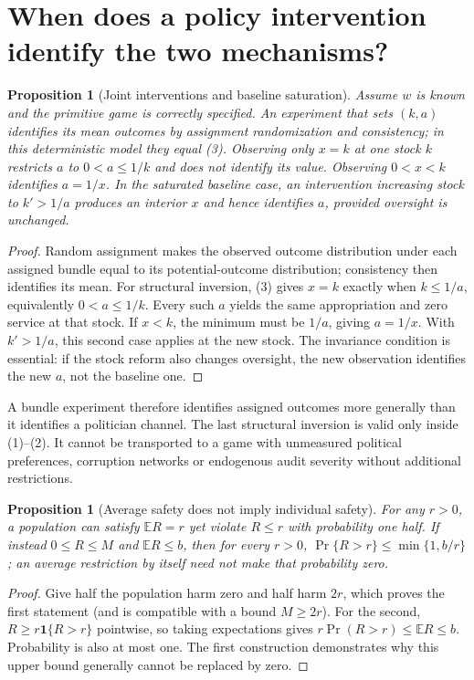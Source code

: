 \documentclass[11pt]{article}
\newtheorem{proposition}[theorem]{Proposition}
\newcommand{\E}{\mathbb E}
\newcommand{\Ind}{\mathbf 1}
\begin{document}
\section{When does a policy intervention identify the two mechanisms?}
\begin{proposition}[Joint interventions and baseline saturation]
Assume $w$ is known and the primitive game is correctly specified.
An experiment that sets $(k,a)$ identifies its mean outcomes by assignment
randomization and consistency; in this deterministic model they equal
(3). Observing only $x=k$ at one stock $k$ restricts $a$ to
$0<a\leq1/k$ and does not identify its value. Observing $0<x<k$ identifies
$a=1/x$. In the saturated baseline case, an intervention increasing stock
to $k'>1/a$ produces an interior $x$ and hence identifies $a$, provided
oversight is unchanged.
\end{proposition}
\begin{proof}
Random assignment makes the observed outcome distribution under each
assigned bundle equal to its potential-outcome distribution; consistency
then identifies its mean. For structural inversion, (3) gives $x=k$
exactly when $k\leq1/a$, equivalently $0<a\leq1/k$. Every such $a$
yields the same appropriation and zero service at that stock. If $x<k$,
the minimum must be $1/a$, giving $a=1/x$. With $k'>1/a$, this second
case applies at the new stock. The invariance condition is essential:
if the stock reform also changes oversight, the new observation identifies
the new $a$, not the baseline one.
\end{proof}
A bundle experiment therefore identifies assigned outcomes more generally
than it identifies a politician channel. The last structural inversion is
valid only inside (1)--(2). It cannot be transported to a game with
unmeasured political preferences, corruption networks or endogenous audit
severity without additional restrictions.

\begin{proposition}[Average safety does not imply individual safety]
For any $r>0$, a population can satisfy $\E R=r$ yet violate $R\leq r$
with probability one half. If instead $0\leq R\leq M$ and
$\E R\leq b$, then for every $r>0$,
$\Pr\{R>r\}\leq\min\{1,b/r\}$; an average restriction by itself need
not make that probability zero.
\end{proposition}
\begin{proof}
Give half the population harm zero and half harm $2r$, which proves the
first statement (and is compatible with a bound $M\geq2r$).
For the second, $R\geq r\Ind\{R>r\}$ pointwise, so taking expectations
gives $r\Pr(R>r)\leq\E R\leq b$. Probability is also at most one.
The first construction demonstrates why this upper bound generally cannot
be replaced by zero.
\end{proof}
\end{document}
